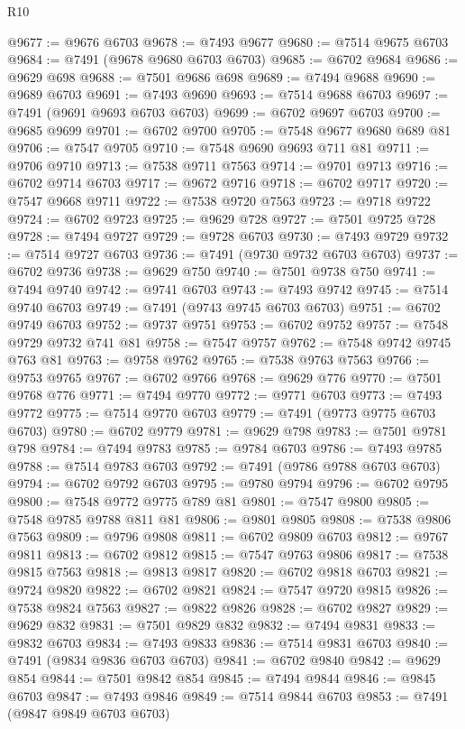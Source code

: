 \begin{lexlean}{R10}
\begin{coremodule}
@9677 := @9676 @6703
@9678 := @7493 @9677
@9680 := @7514 @9675 @6703
@9684 := @7491 (@9678 @9680 @6703 @6703)
@9685 := @6702 @9684
@9686 := @9629 @698
@9688 := @7501 @9686 @698
@9689 := @7494 @9688
@9690 := @9689 @6703
@9691 := @7493 @9690
@9693 := @7514 @9688 @6703
@9697 := @7491 (@9691 @9693 @6703 @6703)
@9699 := @6702 @9697 @6703
@9700 := @9685 @9699
@9701 := @6702 @9700
@9705 := @7548 @9677 @9680 @689 @81
@9706 := @7547 @9705
@9710 := @7548 @9690 @9693 @711 @81
@9711 := @9706 @9710
@9713 := @7538 @9711 @7563
@9714 := @9701 @9713
@9716 := @6702 @9714 @6703
@9717 := @9672 @9716
@9718 := @6702 @9717
@9720 := @7547 @9668 @9711
@9722 := @7538 @9720 @7563
@9723 := @9718 @9722
@9724 := @6702 @9723
@9725 := @9629 @728
@9727 := @7501 @9725 @728
@9728 := @7494 @9727
@9729 := @9728 @6703
@9730 := @7493 @9729
@9732 := @7514 @9727 @6703
@9736 := @7491 (@9730 @9732 @6703 @6703)
@9737 := @6702 @9736
@9738 := @9629 @750
@9740 := @7501 @9738 @750
@9741 := @7494 @9740
@9742 := @9741 @6703
@9743 := @7493 @9742
@9745 := @7514 @9740 @6703
@9749 := @7491 (@9743 @9745 @6703 @6703)
@9751 := @6702 @9749 @6703
@9752 := @9737 @9751
@9753 := @6702 @9752
@9757 := @7548 @9729 @9732 @741 @81
@9758 := @7547 @9757
@9762 := @7548 @9742 @9745 @763 @81
@9763 := @9758 @9762
@9765 := @7538 @9763 @7563
@9766 := @9753 @9765
@9767 := @6702 @9766
@9768 := @9629 @776
@9770 := @7501 @9768 @776
@9771 := @7494 @9770
@9772 := @9771 @6703
@9773 := @7493 @9772
@9775 := @7514 @9770 @6703
@9779 := @7491 (@9773 @9775 @6703 @6703)
@9780 := @6702 @9779
@9781 := @9629 @798
@9783 := @7501 @9781 @798
@9784 := @7494 @9783
@9785 := @9784 @6703
@9786 := @7493 @9785
@9788 := @7514 @9783 @6703
@9792 := @7491 (@9786 @9788 @6703 @6703)
@9794 := @6702 @9792 @6703
@9795 := @9780 @9794
@9796 := @6702 @9795
@9800 := @7548 @9772 @9775 @789 @81
@9801 := @7547 @9800
@9805 := @7548 @9785 @9788 @811 @81
@9806 := @9801 @9805
@9808 := @7538 @9806 @7563
@9809 := @9796 @9808
@9811 := @6702 @9809 @6703
@9812 := @9767 @9811
@9813 := @6702 @9812
@9815 := @7547 @9763 @9806
@9817 := @7538 @9815 @7563
@9818 := @9813 @9817
@9820 := @6702 @9818 @6703
@9821 := @9724 @9820
@9822 := @6702 @9821
@9824 := @7547 @9720 @9815
@9826 := @7538 @9824 @7563
@9827 := @9822 @9826
@9828 := @6702 @9827
@9829 := @9629 @832
@9831 := @7501 @9829 @832
@9832 := @7494 @9831
@9833 := @9832 @6703
@9834 := @7493 @9833
@9836 := @7514 @9831 @6703
@9840 := @7491 (@9834 @9836 @6703 @6703)
@9841 := @6702 @9840
@9842 := @9629 @854
@9844 := @7501 @9842 @854
@9845 := @7494 @9844
@9846 := @9845 @6703
@9847 := @7493 @9846
@9849 := @7514 @9844 @6703
@9853 := @7491 (@9847 @9849 @6703 @6703)

\end{coremodule}
\end{lexlean}
